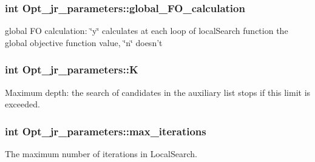 \hypertarget{classOpt__jr__parameters_adf939a159428f604a0d524bee1234bf2}{
\subsubsection[{global\-\_\-\-F\-O\-\_\-calculation}]{\setlength{\rightskip}{0pt plus 5cm}int Opt\-\_\-jr\-\_\-parameters\-::global\-\_\-\-F\-O\-\_\-calculation\hspace{0.3cm}{\ttfamily [private]}}}\label{classOpt__jr__parameters_adf939a159428f604a0d524bee1234bf2}


global F\-O calculation\-: \char`\"{}y\char`\"{} calculates at each loop of local\-Search function the global objective function value, \char`\"{}n\char`\"{} doesn't 

\hypertarget{classOpt__jr__parameters_a71e4771571a4466646cd1433b038b8da}{
\subsubsection[{K}]{\setlength{\rightskip}{0pt plus 5cm}int Opt\-\_\-jr\-\_\-parameters\-::\-K\hspace{0.3cm}{\ttfamily [private]}}}\label{classOpt__jr__parameters_a71e4771571a4466646cd1433b038b8da}


Maximum depth\-: the search of candidates in the auxiliary list stops if this limit is exceeded. 

\hypertarget{classOpt__jr__parameters_aed595357c678f156b58e1010095b7efc}{
\subsubsection[{max\-\_\-iterations}]{\setlength{\rightskip}{0pt plus 5cm}int Opt\-\_\-jr\-\_\-parameters\-::max\-\_\-iterations\hspace{0.3cm}{\ttfamily [private]}}}\label{classOpt__jr__parameters_aed595357c678f156b58e1010095b7efc}


The maximum number of iterations in Local\-Search. 

